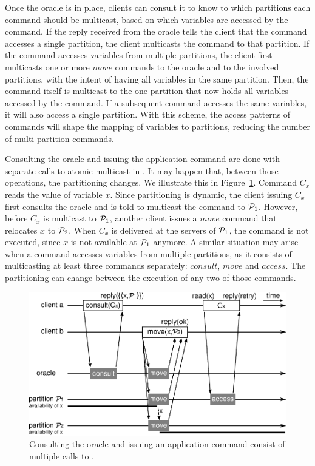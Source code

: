 
Once the oracle is in place, clients can consult it to know to which partitions each command should be multicast, based on which variables are accessed by the command.
If the reply received from the oracle tells the client that the command accesses a single partition, the client multicasts the command to that partition.
If the command accesses variables from multiple partitions, the client first multicasts one or more $move$ commands to the oracle and to the involved partitions, with the intent of having all variables in the same partition.
Then, the command itself is multicast to the one partition that now holds all variables accessed by the command.
If a subsequent command accesses the same variables, it will also access a single partition.
With this scheme, the access patterns of commands will shape the mapping of variables to partitions, reducing the number of multi-partition commands.

Consulting the oracle and issuing the application command are done with separate calls to atomic multicast in \dssmr{}.
It may happen that, between those operations, the partitioning changes.
We illustrate this in Figure~\ref{fig:move_case_1}.
Command $C_x$ reads the value of variable $x$.
Since partitioning is dynamic, the client issuing $C_x$ first consults the oracle and is told to multicast the command to $\mathcal{P}_1$.
However, before $C_x$ is multicast to $\mathcal{P}_1$, another client issues a $move$ command that relocates $x$ to $\mathcal{P}_2$.
When $C_x$ is delivered at the servers of $\mathcal{P}_1$, the command is not executed, since $x$ is not available at $\mathcal{P}_1$ anymore.
A similar situation may arise when a command accesses variables from multiple partitions, as it consists of multicasting at least three commands separately: $consult$, $move$ and $access$.
The partitioning can change between the execution of any two of those commands.

\begin{figure}[b!]
  \includegraphics[width=\linewidth]{figures/move_case_1}
  \caption{Consulting the oracle and issuing an application command consist of multiple calls to \amcast{}.}
  \label{fig:move_case_1}
\end{figure}

